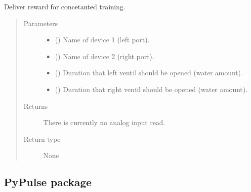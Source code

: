 \documentclass[letterpaper,10pt,english]{sphinxmanual}
\begin{document}
\begin{fulllineitems}
\label{\detokenize{NoSeMazeControl/HelperFunctions:HelperFunctions.Reward.deliver_reward_static_two}}
\pysigstartsignatures
{}
\pysigstopsignatures
\sphinxAtStartPar
Deliver reward for concetanted training.
\begin{quote}\begin{description}
\item[{Parameters}] \leavevmode\begin{itemize}
\item {} 
\sphinxAtStartPar
{} () \textendash{} Name of device 1 (left port).

\item {} 
\sphinxAtStartPar
{} () \textendash{} Name of device 2 (right port).

\item {} 
\sphinxAtStartPar
{} () \textendash{} Duration that left ventil should be opened (water amount).

\item {} 
\sphinxAtStartPar
{} () \textendash{} Duration that right ventil should be opened (water amount).

\end{itemize}

\item[{Returns}] \leavevmode
\sphinxAtStartPar
{} \textendash{} There is currently no analog input read.

\item[{Return type}] \leavevmode
\sphinxAtStartPar
None

\end{description}\end{quote}

\end{fulllineitems}


\sphinxstepscope


\subsection{PyPulse package}
\label{\detokenize{NoSeMazeControl/PyPulse:pypulse-package}}\label{\detokenize{NoSeMazeControl/PyPulse::doc}}
\end{document}
